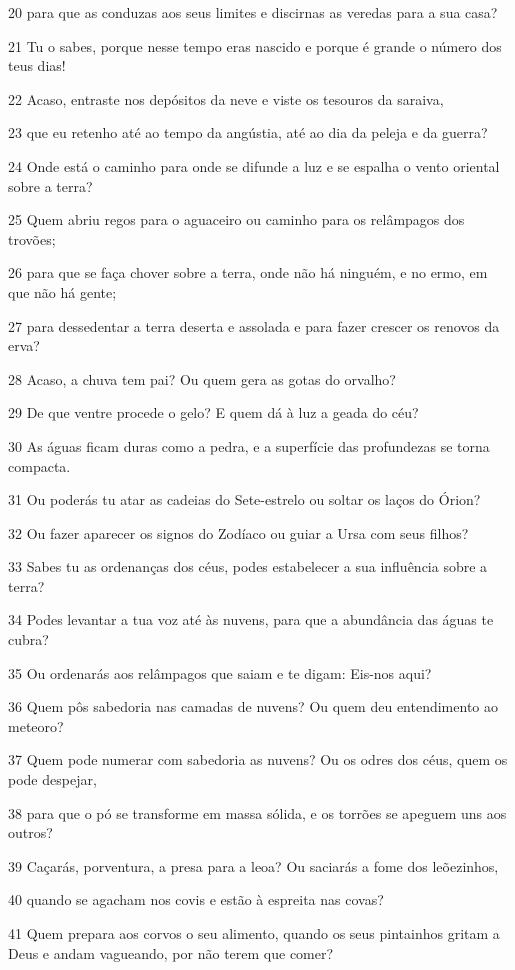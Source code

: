 \par 20 para que as conduzas aos seus limites e discirnas as veredas para a sua casa?
\par 21 Tu o sabes, porque nesse tempo eras nascido e porque é grande o número dos teus dias!
\par 22 Acaso, entraste nos depósitos da neve e viste os tesouros da saraiva,
\par 23 que eu retenho até ao tempo da angústia, até ao dia da peleja e da guerra?
\par 24 Onde está o caminho para onde se difunde a luz e se espalha o vento oriental sobre a terra?
\par 25 Quem abriu regos para o aguaceiro ou caminho para os relâmpagos dos trovões;
\par 26 para que se faça chover sobre a terra, onde não há ninguém, e no ermo, em que não há gente;
\par 27 para dessedentar a terra deserta e assolada e para fazer crescer os renovos da erva?
\par 28 Acaso, a chuva tem pai? Ou quem gera as gotas do orvalho?
\par 29 De que ventre procede o gelo? E quem dá à luz a geada do céu?
\par 30 As águas ficam duras como a pedra, e a superfície das profundezas se torna compacta.
\par 31 Ou poderás tu atar as cadeias do Sete-estrelo ou soltar os laços do Órion?
\par 32 Ou fazer aparecer os signos do Zodíaco ou guiar a Ursa com seus filhos?
\par 33 Sabes tu as ordenanças dos céus, podes estabelecer a sua influência sobre a terra?
\par 34 Podes levantar a tua voz até às nuvens, para que a abundância das águas te cubra?
\par 35 Ou ordenarás aos relâmpagos que saiam e te digam: Eis-nos aqui?
\par 36 Quem pôs sabedoria nas camadas de nuvens? Ou quem deu entendimento ao meteoro?
\par 37 Quem pode numerar com sabedoria as nuvens? Ou os odres dos céus, quem os pode despejar,
\par 38 para que o pó se transforme em massa sólida, e os torrões se apeguem uns aos outros?
\par 39 Caçarás, porventura, a presa para a leoa? Ou saciarás a fome dos leõezinhos,
\par 40 quando se agacham nos covis e estão à espreita nas covas?
\par 41 Quem prepara aos corvos o seu alimento, quando os seus pintainhos gritam a Deus e andam vagueando, por não terem que comer?

